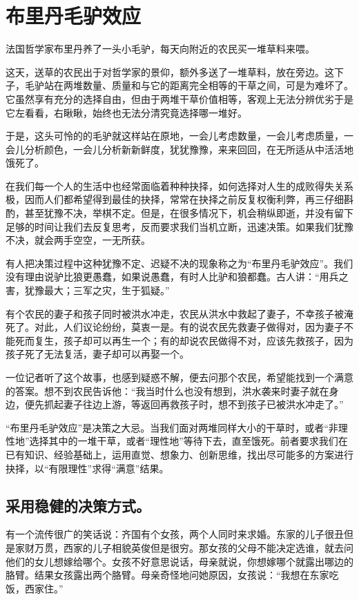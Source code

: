\documentclass[11pt]{ctexart}
\begin{document}
\section{布里丹毛驴效应}
\label{sec-16}


法国哲学家布里丹养了一头小毛驴，每天向附近的农民买一堆草料来喂。

这天，送草的农民出于对哲学家的景仰，额外多送了一堆草料，放在旁边。这下子，毛驴站在两堆数量、质量和与它的距离完全相等的干草之间，可是为难坏了。它虽然享有充分的选择自由，但由于两堆干草价值相等，客观上无法分辨优劣于是它左看看，右瞅瞅，始终也无法分清究竟选择哪一堆好。

于是，这头可怜的的毛驴就这样站在原地，一会儿考虑数量，一会儿考虑质量，一会儿分析颜色，一会儿分析新新鲜度，犹犹豫豫，来来回回，在无所适从中活活地饿死了。

在我们每一个人的生活中也经常面临着种种抉择，如何选择对人生的成败得失关系极，因而人们都希望得到最佳的抉择，常常在抉择之前反复权衡利弊，再三仔细斟酌，甚至犹豫不决，举棋不定。但是，在很多情况下，机会稍纵即逝，并没有留下足够的时间让我们去反复思考，反而要求我们当机立断，迅速决策。如果我们犹豫不决，就会两手空空，一无所获。

有人把决策过程中这种犹豫不定、迟疑不决的现象称之为“布里丹毛驴效应”。我们没有理由说驴比狼更愚蠢，如果说愚蠢，有时人比驴和狼都蠢。古人讲：“用兵之害，犹豫最大；三军之灾，生于狐疑。”

有个农民的妻子和孩子同时被洪水冲走，农民从洪水中救起了妻子，不幸孩子被淹死了。对此，人们议论纷纷，莫衷一是。有的说农民先救妻子做得对，因为妻子不能死而复生，孩子却可以再生一个；有的却说农民做得不对，应该先救孩子，因为孩子死了无法复活，妻子却可以再娶一个。

一位记者听了这个故事，也感到疑惑不解，便去问那个农民，希望能找到一个满意的答案。想不到农民告诉他：“我当时什么也没有想到，洪水袭来时妻子就在身边，便先抓起妻子往边上游，等返回再救孩子时，想不到孩子已被洪水冲走了。”

“布里丹毛驴效应”是决策之大忌。当我们面对两堆同样大小的干草时，或者“非理性地”选择其中的一堆干草，或者“理性地”等待下去，直至饿死。前者要求我们在已有知识、经验基础上，运用直觉、想象力、创新思维，找出尽可能多的方案进行抉择，以“有限理性”求得“满意”结果。
\subsection{采用稳健的决策方式。}
\label{sec-16-1}


有一个流传很广的笑话说：齐国有个女孩，两个人同时来求婚。东家的儿子很丑但是家财万贯，西家的儿子相貌英俊但是很穷。那女孩的父母不能决定选谁，就去问他们的女儿想嫁给哪个。女孩不好意思说话，母亲就说，你想嫁哪个就露出哪边的胳臂。结果女孩露出两个胳臂。母亲奇怪地问她原因，女孩说：“我想在东家吃饭，西家住。”
\end{document}
